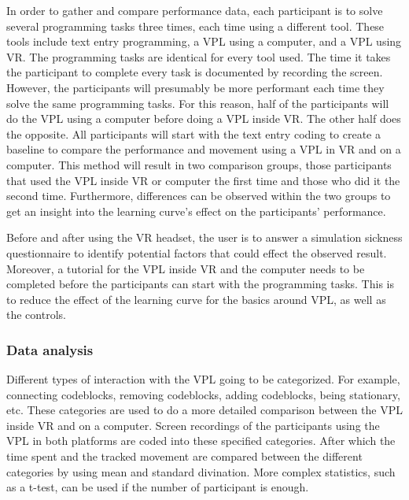 \documentclass{sigchi}
\begin{document}
In order to gather and compare performance data, each participant is to solve several programming tasks three times, each time using a different tool. These tools include text entry programming, a VPL using a computer, and a VPL using VR. The programming tasks are identical for every tool used. The time it takes the participant to complete every task is documented by recording the screen. However, the participants will presumably be more performant each time they solve the same programming tasks. For this reason, half of the participants will do the VPL using a computer before doing a VPL inside VR. The other half does the opposite. All participants will start with the text entry coding to create a baseline to compare the performance and movement using a VPL in VR and on a computer. This method will result in two comparison groups, those participants that used the VPL inside VR or computer the first time and those who did it the second time. Furthermore, differences can be observed within the two groups to get an insight into the learning curve's effect on the participants' performance.


Before and after using the VR headset, the user is to answer a simulation sickness questionnaire to identify potential factors that could effect the observed result. Moreover, a tutorial for the VPL inside VR and the computer needs to be completed before the participants can start with the programming tasks. This is to reduce the effect of the learning curve for the basics around VPL, as well as the controls.

\subsubsection{Data analysis}
Different types of interaction with the VPL going to be categorized. For example, connecting codeblocks, removing codeblocks, adding codeblocks, being stationary, etc. These categories are used to do a more detailed comparison between the VPL inside VR and on a computer. Screen recordings of the participants using the VPL in both platforms are coded into these specified categories. After which the time spent and the tracked movement are compared between the different categories by using mean and standard divination. More complex statistics, such as a t-test, can be used if the number of participant is enough.

\end{document}

